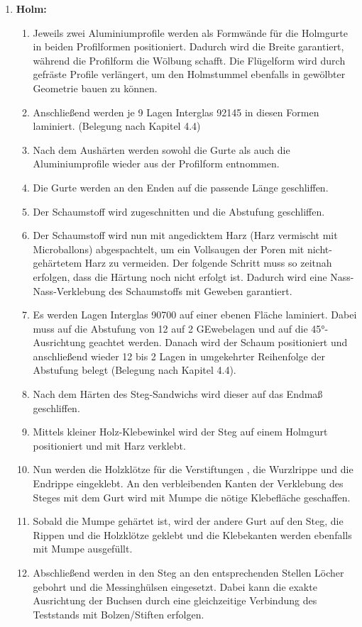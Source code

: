 \begin{enumerate}
	\item \textbf{Holm:}
	\begin{enumerate}
		\item Jeweils zwei Aluminiumprofile werden als Formwände für die Holmgurte in beiden Profilformen positioniert. Dadurch wird die Breite garantiert, während die Profilform die Wölbung schafft. Die Flügelform wird durch gefräste Profile verlängert, um den Holmstummel ebenfalls in gewölbter Geometrie bauen zu können. 
		\item Anschließend werden je 9 Lagen Interglas 92145 in diesen Formen laminiert. (Belegung nach Kapitel  4.4) 
		\item Nach dem Aushärten werden sowohl die Gurte als auch die Aluminiumprofile wieder aus der Profilform entnommen. 
		\item Die Gurte werden an den Enden auf die passende Länge geschliffen.
		\item Der Schaumstoff wird zugeschnitten und die Abstufung geschliffen.
		\item Der Schaumstoff wird nun mit angedicktem Harz (Harz vermischt mit Microballons) \glqq abgespachtelt\grqq, um ein Vollsaugen der Poren mit nicht-gehärtetem Harz zu vermeiden. Der folgende Schritt muss so zeitnah erfolgen, dass die Härtung noch nicht erfolgt ist. Dadurch wird eine Nass-Nass-Verklebung des Schaumstoffs mit Geweben garantiert.
		\item Es werden Lagen Interglas 90700 auf einer ebenen Fläche laminiert. Dabei muss auf die Abstufung von 12 auf 2 GEwebelagen und auf die 45°-Ausrichtung geachtet werden. Danach wird der Schaum positioniert und anschließend wieder 12 bis 2 Lagen in umgekehrter Reihenfolge der Abstufung belegt (Belegung nach Kapitel 4.4).
		\item Nach dem Härten des Steg-Sandwichs wird dieser auf das Endmaß geschliffen.
		\item Mittels kleiner Holz-Klebewinkel wird der Steg auf einem Holmgurt positioniert und mit Harz verklebt.
		\item Nun werden die Holzklötze für die Verstiftungen , die Wurzlrippe und die Endrippe eingeklebt. An den verbleibenden Kanten der Verklebung des Steges mit dem Gurt wird mit Mumpe die nötige Klebefläche geschaffen.
		\item Sobald die Mumpe gehärtet ist, wird der andere Gurt auf den Steg, die Rippen und die Holzklötze geklebt und die Klebekanten werden ebenfalls mit Mumpe ausgefüllt.
		\item Abschließend werden in den Steg an den entsprechenden Stellen Löcher gebohrt und die Messinghülsen eingesetzt. Dabei kann die exakte Ausrichtung der Buchsen durch eine gleichzeitige Verbindung des Teststands mit Bolzen/Stiften erfolgen.

\end{enumerate}
\end{enumerate}
